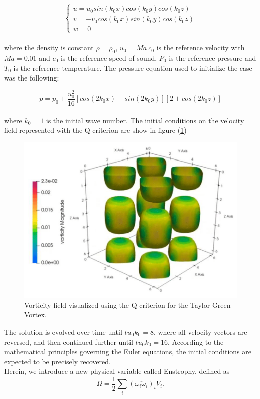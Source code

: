 \documentclass[a5paper]{sapthesis}
\begin{document}
	\begin{equation}
		\begin{cases}
			u = u_0 sin(k_0 x)cos(k_0 y)cos(k_0 z)\\
			v = -v_0 cos(k_0 x)sin(k_0 y)cos(k_0 z)\\
			w = 0
		\end{cases}
	\end{equation}
	\\
	where the density is constant $\rho = \rho_0$, $u_0 = Ma \ c_0$ is the reference velocity with $Ma = 0.01$ and $c_0$ is the reference speed of sound, $P_0$ is the reference pressure and $T_0$ is the reference temperature. The pressure equation used to initialize the case was the following:
	
	\begin{equation}
		p = p_0 + \frac{u_0^2}{16}[cos(2k_0 x)+sin(2k_0 y)][2+ cos(2k_0 z)]		
	\end{equation}
	\\
	where $k_0 = 1$ is the initial wave number. 
	The initial conditions on the velocity field represented with the Q-criterion are show in figure (\ref{TGV_Qcriterion})
	\begin{figure}
		\centering
		\includegraphics[width=0.75\linewidth]{Figures/TGV_Qcriterion}
		\caption{Vorticity field visualized using the Q-criterion for the Taylor-Green Vortex.}
		\label{TGV_Qcriterion}
	\end{figure}
	The solution is evolved over time until $t u_0 k_0 = 8$, where all velocity vectors are reversed, and then continued further until $t u_0 k_0 = 16$. According to the mathematical principles governing the Euler equations, the initial conditions are expected to be precisely recovered.
	\\
	Herein, we introduce a new physical variable called Enstrophy, defined as
	\begin{equation}
		\Omega = \frac{1}{2} \sum_i (\overline{\omega_i \omega_i})_i V_i.
	\end{equation}
\end{document}
